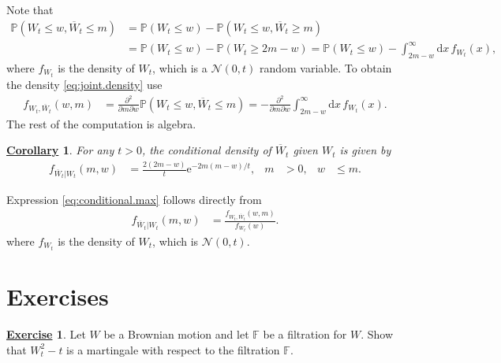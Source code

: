 \documentclass[12pt]{book}
\numberwithin{equation}{chapter}
\theoremstyle{plain}
\numberwithin{theorem}{section}
\newtheorem{corollary}[theorem]{\underline{Corollary}}
\theoremstyle{definition}
\newtheorem{exercise}{\underline{Exercise}}
\numberwithin{exercise}{chapter}
\let\oldendproof\endproof
\renewenvironment{proof}[1][\proofname]{%
  \oldproof[\scshape\underline{#1}]%
}{\oldendproof}
\newcommand{\<}{\langle}
\renewcommand{\>}{\rangle}
\renewcommand{\(}{\left(}
\renewcommand{\)}{\right)}
\renewcommand{\[}{\left[}
\renewcommand{\]}{\right]}
\newcommand\Fb{\mathds{F}}
\newcommand\Pb{\mathds{P}}
\newcommand\Nc{\mathscr{N}}
\newcommand\Wb{\overline{W}}
\renewcommand\d{\partial}
\newcommand\dd{\mathrm{d}}
\newcommand\ee{\mathrm{e}}
\begin{document}
\begin{proof}
Note that
\begin{align}
\Pb(W_t \leq w , \Wb_t \leq m)
	&=	\Pb( W_t \leq w) - \Pb(W_t \leq w , \Wb_t \geq m) \\
	&=	\Pb( W_t \leq w) - \Pb(W_t \geq 2m-w)
	=		\Pb( W_t \leq w) - \int_{2m-w}^\infty \dd x \, f_{W_t}(x) ,
\end{align}
where $f_{W_t}$ is the density of $W_t$, which is a $\Nc(0,t)$ random variable.  
To obtain the density \eqref{eq:joint.density} use
\begin{align}
f_{W_t,\Wb_t}(w,m)
	&=	\frac{\d^2}{\d m \d w} \Pb(W_t \leq w , \Wb_t \leq m)
	=		- \frac{\d^2}{\d m \d w} \int_{2m-w}^\infty \dd x \, f_{W_t}(x) .
\end{align}
The rest of the computation is algebra.
\end{proof}

\begin{corollary}
For any $t>0$, the conditional density of $\Wb_t$ given $W_t$ is given by
\begin{align}
f_{\Wb_t|W_t}(m,w)
	&=	\frac{2(2m-w)}{t}\ee^{-2m(m-w)/t} , &
m
	&> 0 , &
w
	&\leq m . \label{eq:conditional.max}
\end{align}
\end{corollary}

\begin{proof}
Expression \eqref{eq:conditional.max} follows directly from
\begin{align}
f_{\Wb_t|W_t}(m,w)
	&=	\frac{f_{W_t,\Wb_t}(w,m)}{f_{W_t}(w)} .
\end{align}
where $f_{W_t}$ is the density of $W_t$, which is $\Nc(0,t)$.
\end{proof}


\section{Exercises}
\label{sec:exercises-7}

\begin{exercise}
\label{exer:7.1}
Let $W$ be a Brownian motion and let $\Fb$ be a filtration for $W$.  Show that $W_t^2 - t$ is a martingale with respect to the filtration $\Fb$.
\end{exercise}
\end{document}
